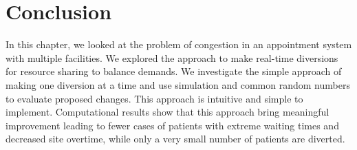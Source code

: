 \section{Conclusion}

In this chapter, we looked at the problem of congestion in an appointment
system with multiple facilities. We explored the approach to make
real-time diversions for resource sharing to balance demands.
We investigate the simple approach of making one diversion at
a time and use simulation and common random numbers to evaluate
proposed changes. This approach is intuitive and simple to
implement. Computational results show that this approach bring
meaningful improvement leading to fewer cases of patients with extreme waiting times
and decreased site overtime, while only a very small number of patients are diverted.
